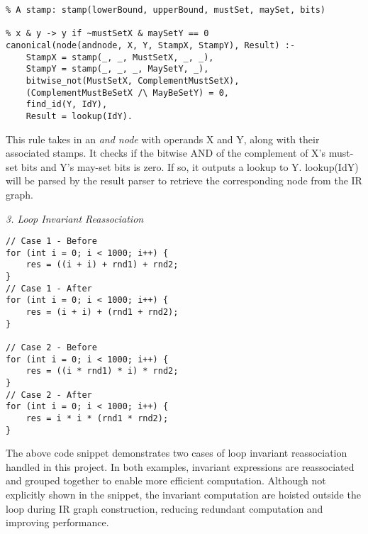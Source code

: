 \begin{lstlisting}
% A stamp: stamp(lowerBound, upperBound, mustSet, maySet, bits)

% x & y -> y if ~mustSetX & maySetY == 0
canonical(node(andnode, X, Y, StampX, StampY), Result) :-
    StampX = stamp(_, _, MustSetX, _, _),
    StampY = stamp(_, _, _, MaySetY, _),
    bitwise_not(MustSetX, ComplementMustSetX),
    (ComplementMustBeSetX /\ MayBeSetY) = 0,
    find_id(Y, IdY),
    Result = lookup(IdY).
\end{lstlisting}

This rule takes in an \textsl{and node} with operands X and Y, along with their associated stamps. It checks if the bitwise AND of the complement of X's must-set bits and Y's may-set bits is zero. If so, it outputs a lookup to Y. lookup(IdY) will be parsed by the result parser to retrieve the corresponding node from the IR graph.

\bigbreak
\textit{3. Loop Invariant Reassociation}
\begin{lstlisting}
// Case 1 - Before
for (int i = 0; i < 1000; i++) {
    res = ((i + i) + rnd1) + rnd2;
}
// Case 1 - After
for (int i = 0; i < 1000; i++) {
    res = (i + i) + (rnd1 + rnd2);
}

// Case 2 - Before
for (int i = 0; i < 1000; i++) {
    res = ((i * rnd1) * i) * rnd2;
}
// Case 2 - After
for (int i = 0; i < 1000; i++) {
    res = i * i * (rnd1 * rnd2);
}
\end{lstlisting}

The above code snippet demonstrates two cases of loop invariant reassociation handled in this project. 
In both examples, invariant expressions are reassociated and grouped together to enable more efficient computation.
Although not explicitly shown in the snippet, the invariant computation are hoisted outside the loop during IR graph construction, reducing redundant computation and improving performance.

